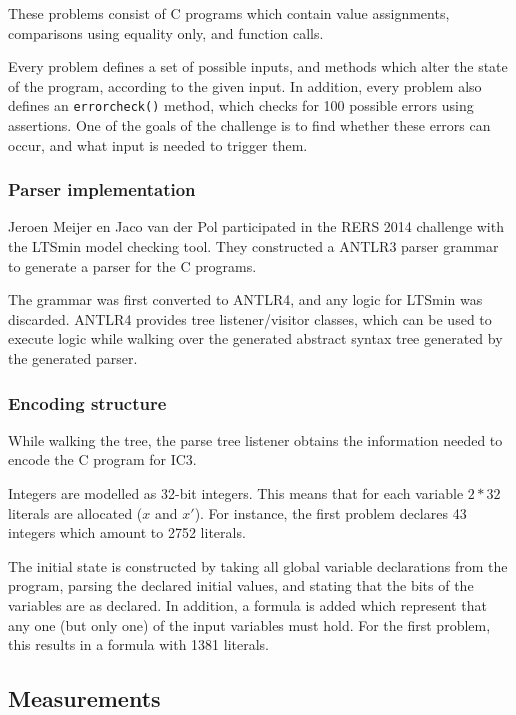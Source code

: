\documentclass[a4paper]{article}
\begin{document}
These problems consist of C programs which contain value assignments, comparisons using equality only, and function calls.

Every problem defines a set of possible inputs, and methods which alter the state of the program, according to the given input.
In addition, every problem also defines an \texttt{errorcheck()} method, which checks for 100 possible errors using assertions. One of the goals of the challenge is to find whether these errors can occur, and what input is needed to trigger them.


\subsubsection{Parser implementation}
Jeroen Meijer en Jaco van der Pol participated in the RERS 2014 challenge with the LTSmin model checking tool.
They constructed a ANTLR3 parser grammar to generate a parser for the C programs.

The grammar was first converted to ANTLR4, and any logic for LTSmin was discarded.
ANTLR4 provides tree listener/visitor classes, which can be used to execute logic while walking over the generated abstract syntax tree generated by the generated parser.

\subsubsection{Encoding structure}
While walking the tree, the parse tree listener obtains the information needed to encode the C program for IC3.

Integers are modelled as 32-bit integers. This means that for each variable $2*32$ literals are allocated ($x$ and $x'$). For instance, the first problem declares 43 integers which amount to 2752 literals.

The initial state is constructed by taking all global variable declarations from the program, parsing the declared initial values, and stating that the bits of the variables are as declared. In addition, a formula is added which represent that any one (but only one) of the input variables must hold. For the first problem, this results in a formula with 1381 literals.

\subsection{Measurements}
\end{document}
